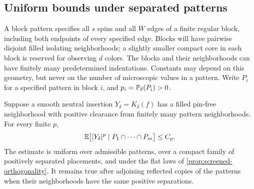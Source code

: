 \subsection{Uniform bounds under separated patterns}

A block pattern specifies all $s$ spins and all $W$ edges of a finite
regular block, including both endpoints of every specified edge. Blocks
will have pairwise disjoint filled isolating neighborhoods; a slightly
smaller compact core in each block is reserved for observing $d$ colors.
The blocks and their neighborhoods can have finitely many predetermined
indentations. Constants may depend on this geometry, but never on the
number of microscopic values in a pattern. Write $P_i$ for a specified
pattern in block $i$, and $p_i=\P_\delta(P_i)>0$.

\begin{lemma}
\label{lem:screen-pattern-moments}
Suppose a smooth neutral insertion $Y_\delta=K_\delta(f)$ has a filled
pin-free neighborhood with positive clearance from finitely many pattern
neighborhoods. For every finite $p$,
\begin{equation}
 \E\bigl[|Y_\delta|^p\mid P_1\cap\cdots\cap P_m\bigr]
       \le C_p.
 \label{eq:screen-pattern-moment}
\end{equation}
The estimate is uniform over admissible patterns, over a compact family
of positively separated placements, and under the flat laws of
\cref{prop:screened-orthogonality}. It remains true after adjoining
reflected copies of the patterns when their neighborhoods have the same
positive separations.
\end{lemma}

